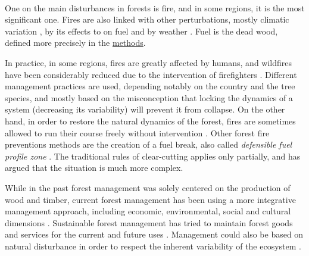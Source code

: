 \documentclass{article}
\begin{document}
\paragraph{}

One on the main disturbances in forests is fire, and in some regions, it is the most significant one. %
Fires are also linked with other perturbations, mostly climatic variation \citep{mckenzie_climatic_2004, da2018dynamics}, by its effects to on fuel \citep{schoennagel_interaction_2004} and by weather \citep{fernandes_fire-smart_2013}. Fuel is the dead wood, defined more precisely in the \hyperref[fuel]{methods}.

In practice, in some regions, fires are greatly affected by humans, and wildfires have been considerably reduced due to the intervention of firefighters \citep{fernandes_fire-smart_2013}. Different management practices are used, depending notably on the country and the tree species, and mostly based on the misconception that locking the dynamics of a system (decreasing its variability) will prevent it from collapse. On the other hand, in order to restore the natural dynamics of the forest, fires are sometimes allowed to run their course freely without intervention \citep{wallenius2011major}. 
Other forest fire preventions methods are the creation of a fuel break, also called \textit{defensible fuel profile zone} \citep{omi_effectiveness_nodate, adams2013mega}. The traditional rules of clear-cutting applies only partially, and \cite{bergeron_natural_2001} has argued that the situation is much more complex.

While in the past forest management was solely centered on the production of wood and timber, current forest management has been using a more integrative management approach, including economic, environmental, social and cultural dimensions \citep{eggers_balancing_2017, raison2001criteria}. Sustainable forest management has tried to maintain forest goods and services for the current and future uses \citep{macdicken_global_2015}. Management could also be based on natural disturbance in order to respect the inherent variability of the ecosystem \citep{bergeron_natural_2002}.
\end{document}
